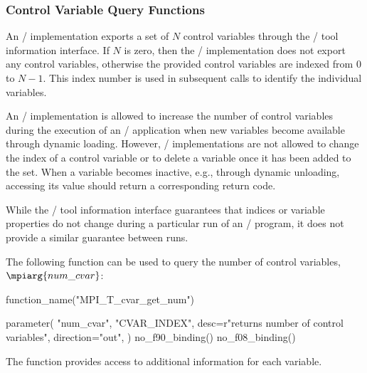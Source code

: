\subsubsection{Control Variable Query Functions}

An \MPI/ implementation exports a set of $N$ control variables through the
\MPI/ tool information interface.  If $N$ is zero, then the \MPI/
implementation does not export any control variables, otherwise the
provided control variables are indexed from $0$ to $N-1$.  This index
number is used in subsequent calls to identify the individual variables.

An \MPI/ implementation is allowed to increase the number of control
variables during the execution of an \MPI/ application when new variables
become available through dynamic loading.  However, \MPI/ implementations
are not allowed to change the index of a control variable or to delete a
variable once it has been added to the set.  When a variable becomes
inactive, e.g., through dynamic unloading, accessing its value should
return a corresponding return code.

\begin{users}
While the \MPI/ tool information interface guarantees that indices or
variable properties do not change during a particular run of an \MPI/
program, it does not provide a similar guarantee between runs.
\end{users}

The following function can be used to query the number of control
variables, $\mpiarg{num\_cvar}$:

\begin{mpi-binding}
    function_name("MPI_T_cvar_get_num")
    
    parameter(
        "num_cvar",
        "CVAR_INDEX",
        desc=r"returns number of control variables",
        direction="out",
    )
    no_f90_binding()
    no_f08_binding()
\end{mpi-binding}

The function  provides access to
additional information for each variable.

